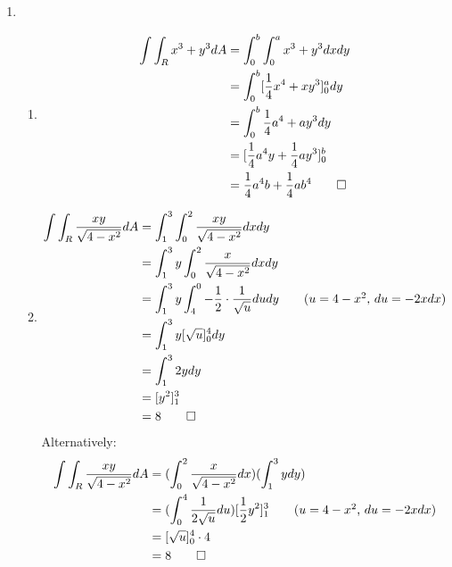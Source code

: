 \documentclass[12pt, a4paper]{article}
\begin{document}
\begin{enumerate}[Q\arabic*.]
  \item 
    \begin{enumerate}[(\alph*)]
      \item 
        \begin{align*}
          \int \int_R x^3 + y^3 dA &= \int^b_0\int^a_0 x^3 + y^3 dx dy\\
                                   &= \int^b_0 [\frac{1}{4}x^4 + xy^3]^a_0 dy\\
                                   &= \int^b_0 \frac{1}{4}a^4 + ay^3 dy\\
                                   &= [\frac{1}{4}a^4y + \frac{1}{4}ay^3]^b_0\\
                                   &= \frac{1}{4}a^4b + \frac{1}{4}ab^4\qed
        \end{align*}

      \item 
        \begin{align*}
          \int \int_R \frac{xy}{\sqrt{4-x^2}}dA &= \int^3_1\int^2_0 \frac{xy}{\sqrt{4-x^2}}dxdy\\
                                                &= \int^3_1 y \int^2_0 \frac{x}{\sqrt{4-x^2}} dxdy\\
                                                &= \int^3_1 y \int^0_4 -\frac{1}{2} \cdot \frac{1}{\sqrt{u}} du dy\tag*{($u=4-x^2$, $du=-2x dx$)}\\
                                                &= \int^3_1 y[\sqrt{u}]^4_0 dy\\
                                                &= \int^3_1 2y dy\\
                                                &= [y^2]^3_1\\
                                                &= 8\qed
        \end{align*}
        Alternatively:
        \begin{align*}
          \int \int_R \frac{xy}{\sqrt{4-x^2}}dA &= (\int^2_0 \frac{x}{\sqrt{4-x^2}}dx)(\int^3_1 y dy)\\
                                                &= (\int^4_0 \frac{1}{2\sqrt{u}} du)[\frac{1}{2}y^2]^3_1\tag*{($u=4-x^2$, $du=-2xdx$)}\\
                                                &= [\sqrt{u}]^4_0 \cdot 4\\
                                                &= 8 \qed
        \end{align*}
    \end{enumerate}


\end{enumerate}
\end{document}
